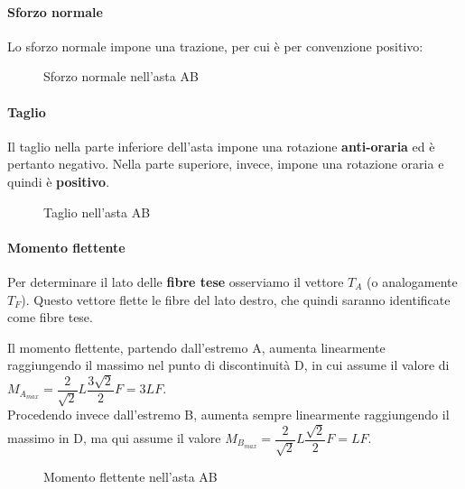 \documentclass[main.tex]{subfiles}
\begin{document}
\paragraph{Sforzo normale}
Lo sforzo normale impone una trazione, per cui è per convenzione positivo:

\begin{figure}[H]
\centering
\resizebox{.3\textwidth}{!}{}
\caption{Sforzo normale nell'asta AB}
\end{figure}

\paragraph{Taglio}
Il taglio nella parte inferiore dell'asta impone una rotazione \textbf{anti-oraria} ed è pertanto negativo. Nella parte superiore, invece, impone una rotazione oraria e quindi è \textbf{positivo}.

\begin{figure}[H]
\centering
\resizebox{.3\textwidth}{!}{}
\caption{Taglio nell'asta AB}
\end{figure}

\paragraph{Momento flettente}
Per determinare il lato delle \textbf{fibre tese} osserviamo il vettore $T_A$ (o analogamente $T_F$). Questo vettore flette le fibre del lato destro, che quindi saranno identificate come fibre tese.

Il momento flettente, partendo dall'estremo A, aumenta linearmente raggiungendo il massimo nel punto di discontinuità D, in cui assume il valore di $M_{A_{max}} = \dfrac{2}{\sqrt{2}}L \dfrac{3\sqrt{2}}{2}F = 3LF$.
\\
Procedendo invece dall'estremo B, aumenta sempre linearmente raggiungendo il massimo in D, ma qui assume il valore $M_{B_{max}} = \dfrac{2}{\sqrt{2}}L \dfrac{\sqrt{2}}{2}F = LF$.

\begin{figure}[H]
\centering
\resizebox{.3\textwidth}{!}{}
\caption{Momento flettente nell'asta AB}
\end{figure}
\end{document}
